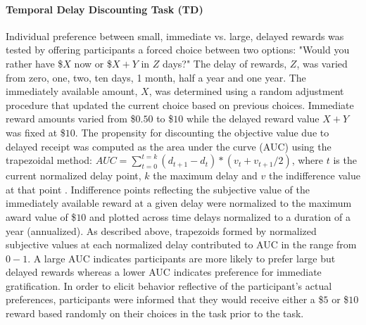 \documentclass{article}%
\begin{document}
\paragraph*{Temporal Delay Discounting Task (TD)} Individual preference between small, immediate vs. large, delayed rewards was tested by offering participants a forced choice between two options: "Would you rather have \$$X$ now or \$$X+Y$ in $Z$ days?" The delay of rewards, $Z$, was varied from zero, one, two, ten days, 1 month, half a year and one year. The immediately available amount, $X$, was determined using a random adjustment procedure that updated the current choice based on previous choices. Immediate reward amounts varied from \$$0.50$ to \$$10$ while the delayed reward value $X+Y$ was fixed at \$$10$. The propensity for discounting the objective value due to delayed receipt was computed as the area under the curve (AUC) using the trapezoidal method: $AUC = \sum_{t=0}^{t=k} (d_{t+1}-d_t)*(v_t+v_{t+1} /2)$, where $t$ is the current normalized delay point, $k$ the maximum delay and $v$ the indifference value at that point \citep{Borges2016,olson2007adolescents, myerson2001area}. Indifference points reflecting the subjective value of the immediately available reward at a given delay were normalized to the maximum award value of \$$10$ and plotted across time delays normalized to a duration of a year (annualized). As described above, trapezoids formed by normalized subjective values at each normalized delay contributed to AUC in the range from $0-1$.  A large AUC indicates participants are more likely to prefer large but delayed rewards whereas a lower AUC indicates preference for immediate gratification. In order to elicit behavior reflective of the participant's actual preferences, participants were informed that they would receive either a \$$5$ or \$$10$ reward based randomly on their choices in the task prior to the task. 
\vspace{2pt}
\end{document}
